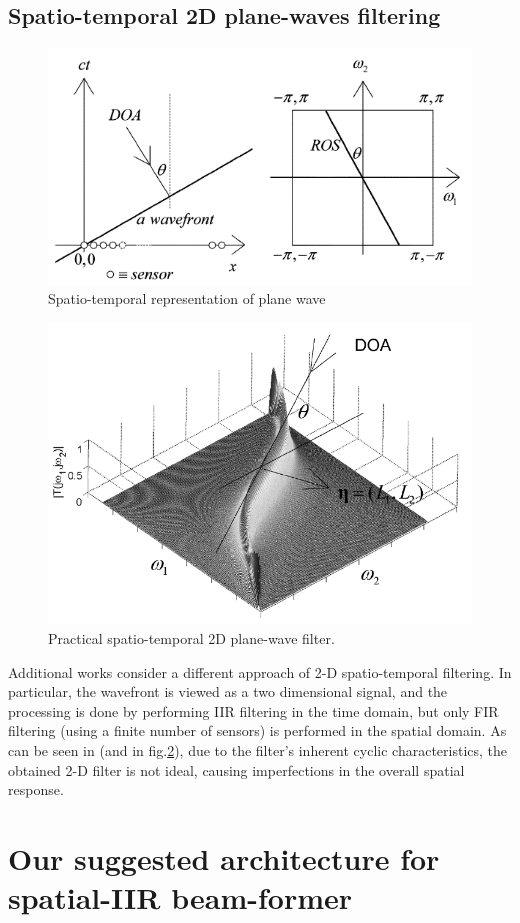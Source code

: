 \documentclass[12pt]{article}
\begin{document}
\subsection*{Spatio-temporal 2D plane-waves filtering}
\begin{figure}
\begin{center}
\includegraphics[width=.4\textwidth]{Media/SpatioTemporalPlaneWave.PNG}
\caption{Spatio-temporal representation of plane wave}
\label{fig:SpatioTemporalPlaneWave}
\end{center}
\end{figure}
\begin{figure}
\begin{center}
\includegraphics[width=.4\textwidth]{Media/SpatioTemporalPlaneWavePracticalFilter.PNG}
\caption{Practical spatio-temporal 2D plane-wave filter.}
\label{fig:SpatioTemporalPlaneWavePracticalFilter}
\end{center}
\end{figure}
Additional works \cite{Madanayake2008ABeamformer,Madanayake2009SystolicWDFs,Madanayake2008AFilters,Bruton2003Three-dimensionalBanks,Ward1986ABeamforming,Joshi2012SynthesisApplications} consider a different approach of 2-D spatio-temporal filtering. In particular, the wavefront is viewed as a two dimensional signal, and the processing is done by performing IIR filtering in the time domain, but only FIR filtering (using a finite number of sensors) is performed in the spatial domain.
As can be seen in \cite{Bruton2003Three-dimensionalBanks} (and in fig.\ref{fig:SpatioTemporalPlaneWavePracticalFilter}), due to the filter's inherent cyclic characteristics, the obtained 2-D filter is not ideal, causing imperfections in the overall spatial response.

\section*{Our suggested architecture for spatial-IIR beam-former}
\end{document}
